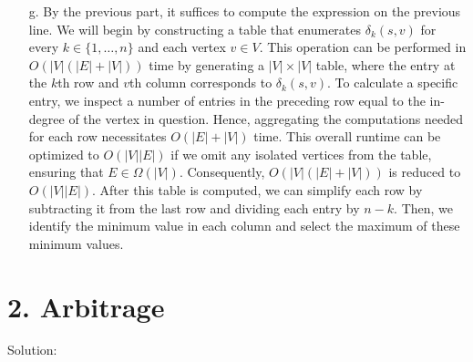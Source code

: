 \documentclass{article}
\begin{document}
\begin{enumerate}
    
    \item[g.] By the previous part, it suffices to compute the expression on the previous line. We will begin by constructing a table that enumerates $\delta_k(s,v)$ for every $k \in \{1, \ldots, n\}$ and each vertex $v \in V$. This operation can be performed in $O(|V|(|E| + |V|))$ time by generating a $|V| \times |V|$ table, where the entry at the $k$th row and $v$th column corresponds to $\delta_k(s,v)$. To calculate a specific entry, we inspect a number of entries in the preceding row equal to the in-degree of the vertex in question. Hence, aggregating the computations needed for each row necessitates $O(|E| + |V|)$ time. This overall runtime can be optimized to $O(|V||E|)$ if we omit any isolated vertices from the table, ensuring that $E \in \Omega(|V|)$. Consequently, $O(|V|(|E| + |V|))$ is reduced to $O(|V||E|)$. After this table is computed, we can simplify each row by subtracting it from the last row and dividing each entry by $n - k$. Then, we identify the minimum value in each column and select the maximum of these minimum values.

\end{enumerate}

\section*{2. Arbitrage}
Solution:
\end{document}
